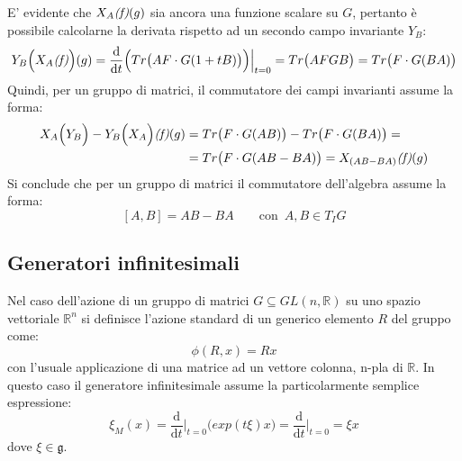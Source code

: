 \documentclass[11pt]{report}
\theoremstyle{plain}
\theoremstyle{definition}
\theoremstyle{remark}
\begin{document}
E' evidente che $X_{A}\emph{(f)}(g) $ sia ancora una funzione scalare su $G$, pertanto è possibile calcolarne la derivata rispetto ad un secondo campo invariante $Y_{B} $:
	\begin{displaymath}
Y_{B} \Bigr(X_{A}\emph{(f)} \Bigr)(g) = \dfrac{\textrm{d} }{\textrm{d}t} \Bigr(Tr \bigr(AF\cdot G( 1 + tB) \bigr) \Bigr) \Bigr|_{t=0} = Tr \bigr(AFGB \bigr) = Tr\bigr(F\cdot G(BA) \bigr) 
	\end{displaymath}
Quindi, per un gruppo di matrici, il commutatore dei campi invarianti assume la forma:
	\begin{displaymath}\begin{split}
X_{A}\Bigr(Y_{B}\Bigr) - Y_{B}\Bigr(X_{A}\Bigr) \emph{(f)} (g) &=  Tr\bigr(F\cdot G(AB) \bigr)- Tr\bigr(F\cdot G(BA) \bigr) = \\ &= Tr\bigr(F\cdot G(AB - BA) \bigr) = X_{(AB - BA)} \emph{(f)} (g)
\end{split}	\end{displaymath}
Si conclude che per un gruppo di matrici il commutatore dell'algebra assume la forma:
\begin{equation}\label{eq:commutatorematrici}
[A,B] = AB-BA \qquad \textrm{con }\,  A,B \in T_{I}G
\end{equation}

\subsection{Generatori infinitesimali}
Nel caso dell'azione di un gruppo di matrici $G \subseteq GL(n, \mathbb{R})$ su uno spazio vettoriale $\mathbb{R}^n $ si definisce l'azione standard di un generico elemento $R$ del gruppo come:
	\begin{displaymath}
\phi(R,x)= R x 
	\end{displaymath}
con l'usuale applicazione di una matrice ad un vettore colonna, n-pla di $\mathbb{R}$.
In questo caso il generatore infinitesimale assume la particolarmente semplice espressione:
	\begin{displaymath}
\xi_{M}(x) = \dfrac{\textrm{d} }{\textrm{d}t} \Bigr|_{t=0} \Bigr( exp(t \xi)  x \Bigr) = \dfrac{\textrm{d} }{\textrm{d}t} \Bigr|_{t=0} = \xi x 
	\end{displaymath}
dove $\xi \in \mathfrak{g}$.
\end{document}
